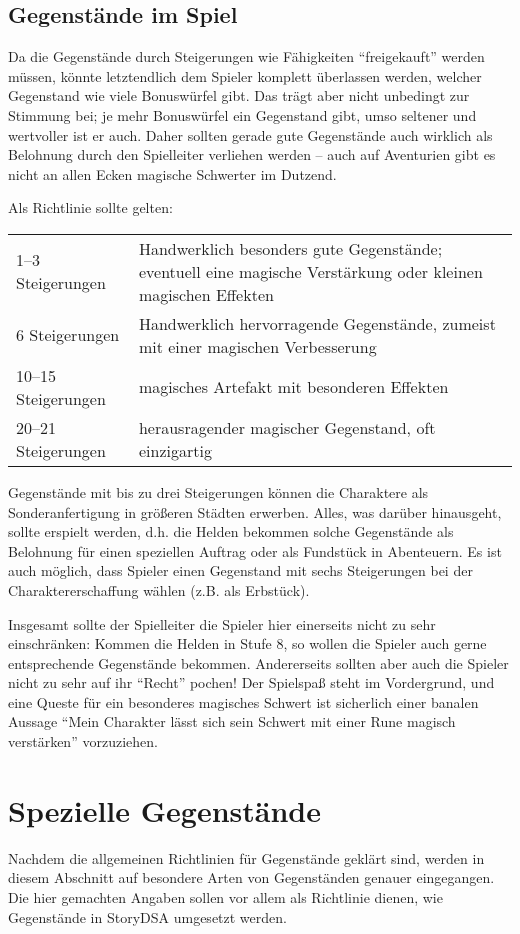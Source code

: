 \subsection{Gegenstände im Spiel}
Da die Gegenstände durch Steigerungen wie Fähigkeiten ``freigekauft'' werden müssen, könnte letztendlich dem Spieler komplett überlassen werden, welcher Gegenstand wie viele Bonuswürfel gibt. Das trägt aber nicht unbedingt zur Stimmung bei; je mehr Bonuswürfel ein Gegenstand gibt, umso seltener und wertvoller ist er auch. Daher sollten gerade gute Gegenstände auch wirklich als Belohnung durch den Spielleiter verliehen werden -- auch auf Aventurien gibt es nicht an allen Ecken magische Schwerter im Dutzend.

Als Richtlinie sollte gelten:

\begin{tabularx}{\textwidth}{lX}
1--3 Steigerungen & Handwerklich besonders gute Gegenstände; eventuell eine magische Verstärkung oder kleinen magischen Effekten \\
6 Steigerungen & Handwerklich hervorragende Gegenstände, zumeist mit einer magischen Verbesserung \\
10--15 Steigerungen & magisches Artefakt mit besonderen Effekten \\
20--21 Steigerungen & herausragender magischer Gegenstand, oft einzigartig \\
\end{tabularx}

Gegenstände mit bis zu drei Steigerungen können die Charaktere als Sonderanfertigung in größeren Städten erwerben. Alles, was darüber hinausgeht, sollte erspielt werden, d.h. die Helden bekommen solche Gegenstände als Belohnung für einen speziellen Auftrag oder als Fundstück in Abenteuern. Es ist auch möglich, dass Spieler einen Gegenstand mit sechs Steigerungen bei der Charaktererschaffung wählen (z.B. als Erbstück).

Insgesamt sollte der Spielleiter die Spieler hier einerseits nicht zu sehr einschränken: Kommen die Helden in Stufe 8, so wollen die Spieler auch gerne entsprechende Gegenstände bekommen. Andererseits sollten aber auch die Spieler nicht zu sehr auf ihr ``Recht'' pochen! Der Spielspaß steht im Vordergrund, und eine Queste für ein besonderes magisches Schwert ist sicherlich einer banalen Aussage ``Mein Charakter lässt sich sein Schwert mit einer Rune magisch verstärken'' vorzuziehen.

\section{Spezielle Gegenstände}
Nachdem die allgemeinen Richtlinien für Gegenstände geklärt sind, werden in diesem Abschnitt auf besondere Arten von Gegenständen genauer eingegangen. Die hier gemachten Angaben sollen vor allem als Richtlinie dienen, wie Gegenstände in StoryDSA umgesetzt werden.

